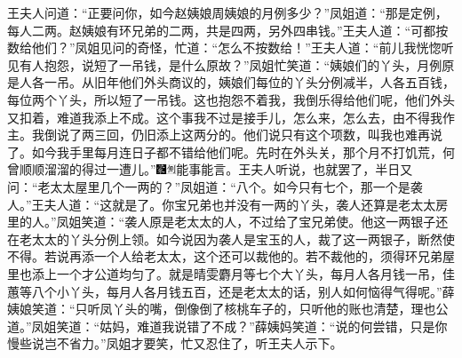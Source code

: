 王夫人问道：“正要问你，如今赵姨娘周姨娘的月例多少？”凤姐道：“那是定例，每人二两。赵姨娘有环兄弟的二两，共是四两，另外四串钱。”王夫人道：“可都按数给他们？”凤姐见问的奇怪，忙道：“怎么不按数给！”王夫人道：“前儿我恍惚听见有人抱怨，说短了一吊钱，是什么原故？”凤姐忙笑道：“姨娘们的丫头，月例原是人各一吊。从旧年他们外头商议的，姨娘们每位的丫头分例减半，人各五百钱，每位两个丫头，所以短了一吊钱。这也抱怨不着我，我倒乐得给他们呢，他们外头又扣着，难道我添上不成。这个事我不过是接手儿，怎么来，怎么去，由不得我作主。我倒说了两三回，仍旧添上这两分的。他们说只有这个项数，叫我也难再说了。如今我手里每月连日子都不错给他们呢。先时在外头关，那个月不打饥荒，何曾顺顺溜溜的得过一遭儿。”{\includegraphics[width=3mm]{../Images/00006}\includegraphics[width=3mm]{../Images/00011}\footnotesize \kaishu 能事能言。}王夫人听说，也就罢了，半日又问：“老太太屋里几个一两的？”凤姐道：“八个。如今只有七个，那一个是袭人。”王夫人道：“这就是了。你宝兄弟也并没有一两的丫头，袭人还算是老太太房里的人。”凤姐笑道：“袭人原是老太太的人，不过给了宝兄弟使。他这一两银子还在老太太的丫头分例上领。如今说因为袭人是宝玉的人，裁了这一两银子，断然使不得。若说再添一个人给老太太，这个还可以裁他的。若不裁他的，须得环兄弟屋里也添上一个才公道均匀了。就是晴雯麝月等七个大丫头，每月人各月钱一吊，佳蕙等八个小丫头，每月人各月钱五百，还是老太太的话，别人如何恼得气得呢。”薛姨娘笑道：“只听凤丫头的嘴，倒像倒了核桃车子的，只听他的账也清楚，理也公道。”凤姐笑道：“姑妈，难道我说错了不成？”薛姨妈笑道：“说的何尝错，只是你慢些说岂不省力。”凤姐才要笑，忙又忍住了，听王夫人示下。

